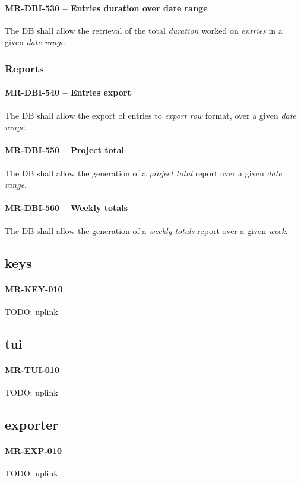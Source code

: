 \paragraph{MR-DBI-530 -- Entries duration over date range}
The \gls{DB} shall allow the retrieval of the total \emph{duration} worked
on \emph{entries} in a given \emph{date range}.

\subsubsection{Reports}
\paragraph{MR-DBI-540 -- Entries export}
The \gls{DB} shall allow the export of entries to \emph{export row} format,
over a given \emph{date range}.

\paragraph{MR-DBI-550 -- Project total}
The \gls{DB} shall allow the generation of a \emph{project total} report
over a given \emph{date range}.

\paragraph{MR-DBI-560 -- Weekly totals}
The \gls{DB} shall allow the generation of a \emph{weekly totals} report
over a given \emph{week}.

\subsection{keys}
\paragraph{MR-KEY-010}
TODO: uplink

\subsection{tui}
\paragraph{MR-TUI-010}
TODO: uplink

\subsection{exporter}
\paragraph{MR-EXP-010}
TODO: uplink
